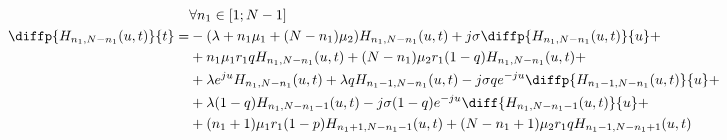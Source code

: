 \begin{equation}\label{hFirstEquation6}
\begin{aligned}
&\forall n_1 \in [1;N-1]\\
\diffp{H_{n_1, N-n_1}(u,t)}{t}=
&-(\lambda+n_1\mu_1+(N-n_1)\mu_2)H_{n_1, N-n_1}(u,t) 
		+ j\sigma\diffp{H_{n_1, N-n_1}(u,t)}{u}+\\
	&+ n_1 \mu_1 r_1 q H_{n_1, N-n_1}(u,t)
		+ (N-n_1)\mu_2 r_1 (1-q) H_{n_1, N-n_1}(u,t)+\\
	&+\lambda e^{ju} H_{n_1, N-n_1}(u,t)
		+\lambda qH_{n_1-1, N-n_1}(u,t) 
		- j \sigma q  e^{-ju} \diffp{H_{n_1-1, N-n_1}(u,t)}{u}+\\
	&+\lambda (1-q)H_{n_1, N-n_1-1}(u,t) 
		- j \sigma (1-q) e^{-ju} \diff{H_{n_1, N-n_1-1}(u,t)}{u}+\\
	&+(n_1+1)\mu_1 r_1 (1-p) H_{n_1 + 1 , N - n_1 -1}(u,t)
		+ (N - n_1 +1)\mu_2 r_{1}q H_{n_1 - 1 , N - n_1 +1}(u,t)
\end{aligned}
\end{equation}

